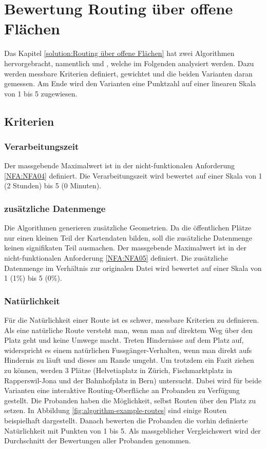 \section{Bewertung Routing über offene Flächen}
\label{sec:Bewertung Routing über offene Flächen}

Das Kapitel \ref{solution:Routing über offene Flächen} hat zwei Algorithmen hervorgebracht, namentlich  und , welche im Folgenden analysiert werden. Dazu werden messbare Kriterien definiert, gewichtet und die beiden Varianten daran gemessen. Am Ende wird den Varianten eine Punktzahl auf einer linearen Skala von 1 bis 5 zugewiesen.

\subsection{Kriterien}
\label{sub:Kriterien}

\subsubsection{Verarbeitungszeit}
\label{criteria:Verarbeitungszeit}
Der massgebende Maximalwert ist in der nicht-funktionalen Anforderung \ref{NFA:NFA04} definiert. Die Verarbeitungszeit wird bewertet auf einer Skala von 1 (2 Stunden) bis 5 (0 Minuten).


\subsubsection{zusätzliche Datenmenge}
\label{criteria:zusätzliche Datenmenge}
Die Algorithmen generieren zusätzliche Geometrien. Da die öffentlichen Plätze nur einen kleinen Teil der Kartendaten bilden, soll die zusätzliche Datenmenge keinen signifikaten Teil ausmachen. Der massgebende Maximalwert ist in der nicht-funktionalen Anforderung \ref{NFA:NFA05} definiert. Die zusätzliche Datenmenge im Verhältnis zur originalen Datei wird bewertet auf einer Skala von 1 (1\%) bis 5 (0\%).


\subsubsection{Natürlichkeit}
\label{criteria:Natürlichkeit}
Für die Natürlichkeit einer Route ist es schwer, messbare Kriterien zu definieren. Als eine natürliche Route versteht man, wenn man auf direktem Weg über den Platz geht und keine Umwege macht. Treten Hindernisse auf dem Platz auf, widerspricht es einem natürlichen Fussgänger-Verhalten, wenn man direkt aufs Hindernis zu läuft und dieses am Rande umgeht. Um trotzdem ein Fazit ziehen zu können, werden 3 Plätze (Helvetiaplatz in Zürich, Fischmarktplatz in Rapperswil-Jona und der Bahnhofplatz in Bern) untersucht. Dabei wird für beide Varianten eine interaktive Routing-Oberfläche an Probanden zu Verfügung gestellt. Die Probanden haben die Möglichkeit, selbst Routen über den Platz zu setzen. In Abbildung \ref{fig:algorithm-example-routes} sind einige Routen beispielhaft dargestellt. Danach bewerten die Probanden die vorhin definierte Natürlichkeit mit Punkten von 1 bis 5. Als massgeblicher Vergleichswert wird der Durchschnitt der Bewertungen aller Probanden genommen.

